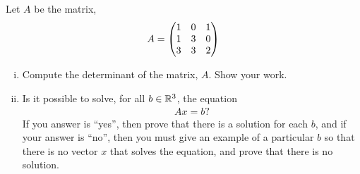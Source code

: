 \begin{question}
    \normalfont

    Let $A$ be the matrix,
    \begin{align*}
        A =
        \begin{pmatrix} 1 &0 &1\\ 1 &3 &0\\ 3 &3 &2 \end{pmatrix}
    \end{align*}

    \begin{enumerate}[(i)]
        \item Compute the determinant of the matrix, $A$. Show your work.

        \item Is it possible to solve, for all $b\in{\mathbb R}^3$, the equation
              \begin{align*}
                  Ax=b?
              \end{align*}
              If you answer is ``yes'', then prove that there is a solution for each $b$, and if your answer is ``no'', then you must give an example of a particular $b$ so that there is no vector $x$ that solves the equation, and prove that there is no solution.
    \end{enumerate}
\end{question}

